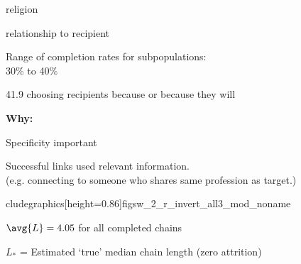     religion
   
    relationship to recipient
  

  \bigskip

  {
    Range of completion rates for subpopulations: \\
    \mbox{} \hfill 30\% to 40\%
  }
  

 41.9%
    choosing recipients because 
    or because they will 
  

  \textbf{Why:}
    
     
      Specificity important
     
      Successful links used relevant information.\\
      (e.g. connecting to someone who shares same profession as target.)
    
  

cludegraphics[height=0.86\textheight]{figsw_2_r_invert_all3_mod_noname}
%
    
    
    
      $\avg{L} = 4.05$ for all completed chains
    
      $L_\ast$ = Estimated `true' median chain length (zero attrition)
    
